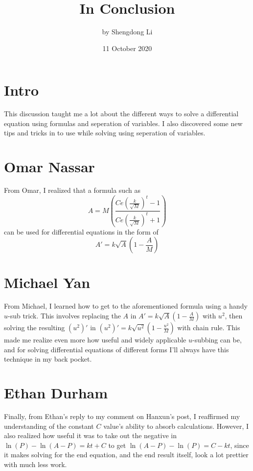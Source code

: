 \documentclass[12pt]{article}
\begin{document}
\title{In Conclusion}
\author{by Shengdong Li}
\date{11 October 2020}
\maketitle

\section{Intro}
This discussion taught me a lot about the different ways to solve a differential equation using formulas and seperation of variables. I also discovered some new tips and tricks in to use while solving using seperation of variables.

\section{Omar Nassar}
From Omar, I realized that a formula such as
$$
A=M\left(\frac{Ce\left(\frac{k}{\sqrt{M}}\right)^{t}-1}{Ce\left(\frac{k}{\sqrt{M}}\right)^{t}+1}\right)
$$
can be used for differential equations in the form of 
$$
A'=k\sqrt{A}\left(1-\frac{A}{M}\right)
$$
\section{Michael Yan}
From Michael, I learned how to get to the aforementioned formula using a handy $u$-sub trick. This involves replacing the $A$ in $A'=k\sqrt{A}\left(1-\frac{A}{M}\right)$ with $u^{2}$, then solving the resulting $\left(u^{2}\right)'$ in $\left(u^{2}\right)'=k\sqrt{u^{2}}\left(1-\frac{u^{2}}{M}\right)$ with chain rule. This made me realize even more how useful and widely applicable $u$-subbing can be, and for solving differential equations of different forms I'll always have this technique in my back pocket.
\section{Ethan Durham}
Finally, from Ethan's reply to my comment on Hanxun's post, I reaffirmed my understanding of the constant $C$ value's ability to absorb calculations. However, I also realized how useful it was to take out the negative in $\ln\left(P\right)-\ln\left(A-P\right)=kt+C$ to get $\ln\left(A-P\right)-\ln\left(P\right)=C-kt$, since it makes solving for the end equation, and the end result itself, look a lot prettier with much less work.
\end{document}
